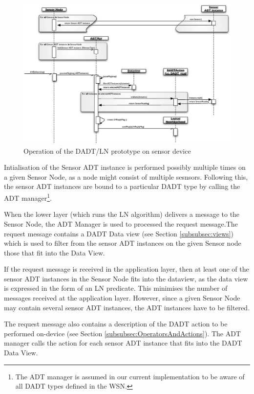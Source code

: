 \begin{figure}
\centering
\includegraphics[width=\textwidth]{img/SeqDiagram_Sensornode.eps}
\caption[Operation of the DADT/LN prototype on sensor device]{Operation of the DADT/LN prototype on sensor device}
\label{Fig:SeqDiagram_Sensornode}
\end{figure}

Intialisation of the Sensor ADT instance is performed possibly
multiple times on a given Sensor Node, as a node might consist of multiple sesnsors. Following
this, the sensor ADT instances are bound to a particular DADT type by calling
the ADT manager\footnote{The ADT manager is assumed in our
current implementation to be aware of all DADT types defined in the WSN.}.

When the lower layer (which runs the LN algorithm) delivers a message to the
Sensor Node, the ADT Manager is used to processed the request message.The
request message contains a DADT Data view (see Section \ref{subsubsec:views})
which is used to filter from the sensor ADT instances on the given Sensor node
those that fit into the Data View. 

If the request message is received in the application layer, then at least one of
the sensor ADT instances in the Sensor Node fits into the dataview, as the data
view is expressed in the form of an LN predicate. This minimises the number of
messages received at the application layer. However, since a given Sensor Node
may contain several sensor ADT instances, the ADT instances have to be filtered.

The request message also contains a description of the DADT action to be
performed on-device (see Section
\ref{subsubsec:OperatorsAndActions}). The ADT manager calls the action for each
sensor ADT instance that fits into the DADT Data View. 

